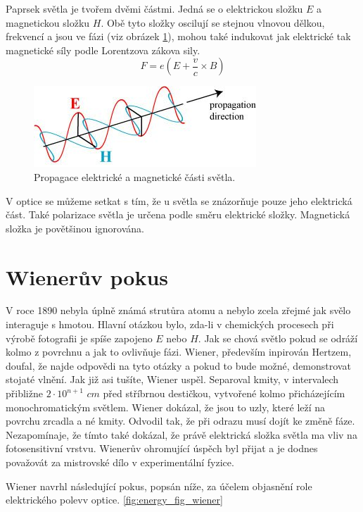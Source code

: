 \documentclass[12pt,a4paper,titlepage,final]{report}
\begin{document}
Paprsek světla je tvořem dvěmi částmi. Jedná se o elektrickou složku
$E$ a magnetickou složku $H$. Obě tyto složky oscilují se stejnou
vlnovou dělkou, frekvencí a jsou ve fázi (viz obrázek \ref{fig:ehpropagation}), mohou také indukovat jak elektrické tak magnetické síly podle Lorentzova zákova sily. \citep{skullsinthestars}
\begin{equation}
F = e(E+\frac{v}{c}\times B)
\end{equation}

\begin{figure}[!htb]
   \centering
 	\includegraphics{ehpropagation}
   \caption{Propagace elektrické a magnetické části světla.}
   \label{fig:ehpropagation}
\end{figure}

V optice se můžeme setkat s tím, že u světla se znázorňuje pouze jeho
elektrická část. Také polarizace světla je určena podle směru elektrické složky. Magnetická složka je povětšinou ignorována.

\section{Wienerův pokus}
V roce 1890 nebyla úplně známá strutůra atomu a nebylo zcela zřejmé
jak svělo interaguje s hmotou. Hlavní otázkou bylo, zda-li
v chemických procesech při výrobě fotografii je spíše zapojeno 
$E$ nebo $H$. Jak se chová světlo pokud se odráží kolmo z povrchnu a jak to ovlivňuje fázi. 
Wiener, především inpirován Hertzem, doufal, že najde odpovědi na tyto otázky a pokud to bude možné,
demonstrovat stojaté vlnění. Jak již asi tušíte, Wiener uspěl. Separoval kmity, v intervalech přibližne $2\cdot 10^{n+1}$ $cm$ před
stříbrnou destičkou, vytvořené kolmo přicházejícím monochromatickým světlem. Wiener dokázal, že jsou to uzly, které leží
na povrchu zrcadla a né kmity. Odvodil tak, že při odrazu musí dojít ke změně fáze. Nezapomínaje, že tímto také dokázal, že právě
elektrická složka světla ma vliv na fotosensitivní vrstvu. Wienerův ohromující úspěch byl přijat a je dodnes považovát za mistrovské dílo
v experimentální fyzice.

Wiener navrhl následující pokus, popsán níže, za účelem objasnění role elektrického polevv optice. \ref{fig:energy_fig_wiener}
\end{document}
